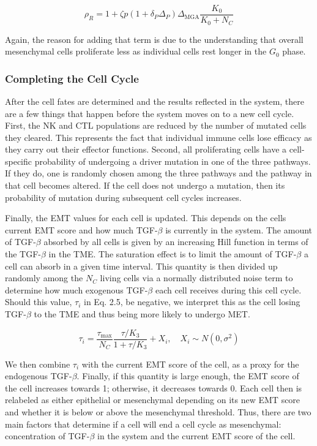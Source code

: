 \documentclass[11pt, a4paper, preprint]{article}
\begin{document}
\begin{equation}\tag{2.4}
\rho_R = 1 + \zeta p(1+\delta_P\Delta_P)\Delta_{\text{MGA}}\frac{K_0}{K_0+N_C}
\end{equation}

Again, the reason for adding that term is due to the understanding that overall mesenchymal cells proliferate less as individual cells rest longer in the $G_0$ phase.

\subsubsection{Completing the Cell Cycle}
After the cell fates are determined and the results reflected in the system, there are a few things that happen before the system moves on to a new cell cycle.
First, the NK and CTL populations are reduced by the number of mutated cells they cleared.
This represents the fact that individual immune cells lose efficacy as they carry out their effector functions. 
Second, all proliferating cells have a cell-specific probability of undergoing a driver mutation in one of the three pathways.
If they do, one is randomly chosen among the three pathways and the pathway in that cell becomes altered.
If the cell does not undergo a mutation, then its probability of mutation during subsequent cell cycles increases.
\par
Finally, the EMT values for each cell is updated.
This depends on the cells current EMT score and how much TGF-$\beta$ is currently in the system.
The amount of TGF-$\beta$ absorbed by all cells is given by an increasing Hill function in terms of the TGF-$\beta$ in the TME.
The saturation effect is to limit the amount of TGF-$\beta$ a cell can absorb in a given time interval.
This quantity is then divided up randomly among the $N_C$ living cells via a normally distributed noise term to determine how much exogenous TGF-$\beta$ each cell receives during this cell cycle.
Should this value, $\tau_i$ in Eq. 2.5, be negative, we interpret this as the cell losing TGF-$\beta$ to the TME and thus being more likely to undergo MET.	

\begin{equation}\tag{2.5}
\tau_i = \frac{\tau_{\text{max}}}{N_C}\frac{\tau/K_3}{1+\tau/K_3} + X_i
, \quad X_i \sim N(0,\sigma^2)
\end{equation}


We then combine $\tau_i$ with the current EMT score of the cell, as a proxy for the endogenous TGF-$\beta$.
Finally, if this quantity is large enough, the EMT score of the cell increases towards 1; otherwise, it decreases towards 0.
Each cell then is relabeled as either epithelial or mesenchymal depending on its new EMT score and whether it is below or above the mesenchymal threshold.
Thus, there are two main factors that determine if a cell will end a cell cycle as mesenchymal: concentration of TGF-$\beta$ in the system and the current EMT score of the cell.
\end{document}
